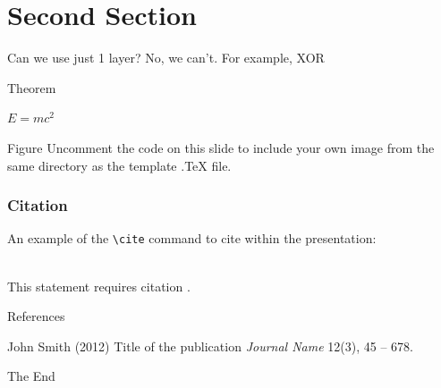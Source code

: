 \documentclass[aspectratio=169,xcolor=dvipsnames]{beamer}
\begin{document}
\section{Second Section}

\begin{frame}{Can we use just 1 layer?}
    No, we can't. For example, XOR
\end{frame}


\begin{frame}{Theorem}
    \begin{theorem}
        $E = mc^2$
    \end{theorem}
\end{frame}


\begin{frame}{Figure}
    Uncomment the code on this slide to include your own image from the same directory as the template .TeX file.
\end{frame}


\begin{frame}[fragile] %
    \frametitle{Citation}
    An example of the \verb|\cite| command to cite within the presentation:\\~

    This statement requires citation \cite{p1}.
\end{frame}


\begin{frame}{References}
    \footnotesize{
        \begin{thebibliography}{99}
             John Smith (2012)
            \newblock Title of the publication
            \newblock \emph{Journal Name} 12(3), 45 -- 678.
        \end{thebibliography}
    }
\end{frame}


\begin{frame}
    \Huge{\centerline{The End}}
\end{frame}

\end{document}
